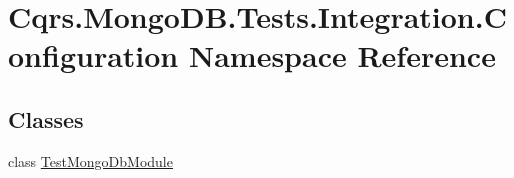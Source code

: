 \hypertarget{namespaceCqrs_1_1MongoDB_1_1Tests_1_1Integration_1_1Configuration}{}\section{Cqrs.\+Mongo\+D\+B.\+Tests.\+Integration.\+Configuration Namespace Reference}
\label{namespaceCqrs_1_1MongoDB_1_1Tests_1_1Integration_1_1Configuration}
\subsection*{Classes}
\begin{DoxyCompactItemize}
\item 
class \hyperlink{classCqrs_1_1MongoDB_1_1Tests_1_1Integration_1_1Configuration_1_1TestMongoDbModule}{Test\+Mongo\+Db\+Module}
\end{DoxyCompactItemize}
